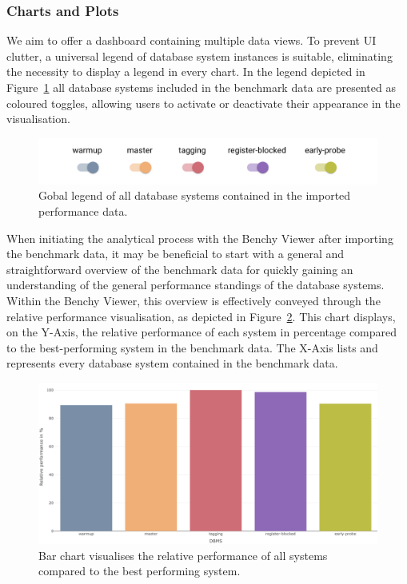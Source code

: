 \subsubsection{Charts and Plots}

We aim to offer a dashboard containing multiple data views. To prevent UI clutter, a universal legend of database system instances is suitable, eliminating the necessity to display a legend in every chart. In the legend depicted in Figure~\ref{fig:legend} all database systems included in the benchmark data are presented as coloured toggles, allowing users to activate or deactivate their appearance in the visualisation.

\begin{figure}[h]
    \centering
    \includegraphics[width=1\linewidth]{figures/legend.png}
    \caption{Gobal legend of all database systems contained in the imported performance data.}
    \label{fig:legend}
  \end{figure}



When initiating the analytical process with the Benchy Viewer after importing the benchmark data, it may be beneficial to start with a general and straightforward overview of the benchmark data for quickly gaining an understanding of the general performance standings of the database systems.\\
Within the Benchy Viewer, this overview is effectively conveyed through the relative performance visualisation, as depicted in Figure~\ref{fig:relative-performance}. This chart displays, on the Y-Axis, the relative performance of each system in percentage compared to the best-performing system in the benchmark data. The X-Axis lists and represents every database system contained in the benchmark data.

\begin{figure}[h]
  \centering
  \includegraphics[width=1\linewidth]{figures/bsp-relative-performance.png}
  \caption{Bar chart visualises the relative performance of all systems compared to the best performing system.}
  \label{fig:relative-performance}
\end{figure}

